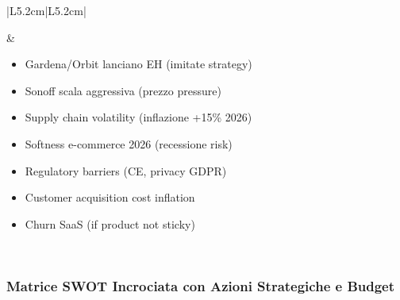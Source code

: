 \documentclass[11pt,a4paper]{report}
\begin{document}
\begin{longtable}{|L{5.2cm}|L{5.2cm}|}
\begin{itemize}
\end{itemize} &
\begin{itemize}\itemsep0pt
\item Gardena/Orbit lanciano EH (imitate strategy)
\item Sonoff scala aggressiva (prezzo pressure)
\item Supply chain volatility (inflazione +15\% 2026)
\item Softness e-commerce 2026 (recessione risk)
\item Regulatory barriers (CE, privacy GDPR)
\item Customer acquisition cost inflation
\item Churn SaaS (if product not sticky)
\end{itemize} \\ \hline
\end{longtable}

\subsubsection{Matrice SWOT Incrociata con Azioni Strategiche e Budget}
\label{sec:swot-cross}
\end{document}

